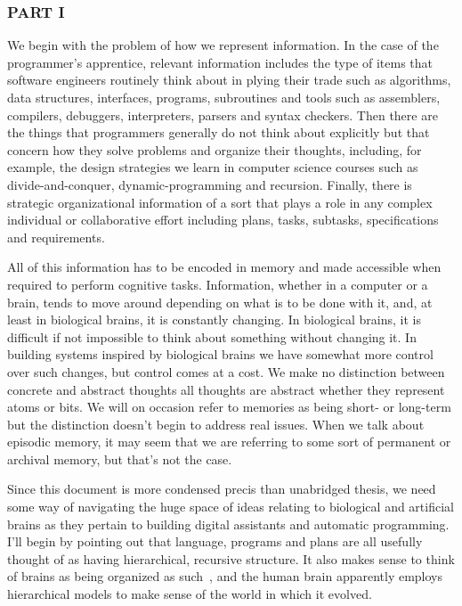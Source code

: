 

\subsubsection*{PART I}


We begin with the problem of how we represent information. In the case of the programmer's apprentice, relevant information includes the type of items that software engineers routinely think about in plying their trade such as algorithms, data structures, interfaces, programs, subroutines and tools such as assemblers, compilers, debuggers, interpreters, parsers and syntax checkers. Then there are the things that programmers generally do not think about explicitly but that concern how they solve problems and organize their thoughts, including, for example, the design strategies we learn in computer science courses such as divide-and-conquer, dynamic-programming and recursion. Finally, there is strategic organizational information of a sort that plays a role in any complex individual or collaborative effort including plans, tasks, subtasks, specifications and requirements.

All of this information has to be encoded in memory and made accessible when required to perform cognitive tasks. Information, whether in a computer or a brain, tends to move around depending on what is to be done with it, and, at least in biological brains, it is constantly changing. In biological brains, it is difficult if not impossible to think about something without changing it. In building systems inspired by biological brains we have somewhat more control over such changes, but control comes at a cost. We make no distinction between concrete and abstract thoughts \emdash{} all thoughts are abstract whether they represent atoms or bits. We will on occasion refer to memories as being short- or long-term but the distinction doesn't begin to address real issues. When we talk about episodic memory, it may seem that we are referring to some sort of permanent or archival memory, but that's not the case.

Since this document is more condensed precis than unabridged thesis, we need some way of navigating the huge space of ideas relating to biological and artificial brains as they pertain to building digital assistants and automatic programming. I'll begin by pointing out that language, programs and plans are all usefully thought of as having hierarchical, recursive structure. It also makes sense to think of brains as being organized as such~\cite{Ballard2015,Kurzweil2012,DeanAMAI-06,GeorgeandHawkinsIJCNN-05,DeanAAAI-05,Hawkins04}, and the human brain apparently employs hierarchical models to make sense of the world in which it evolved. 

